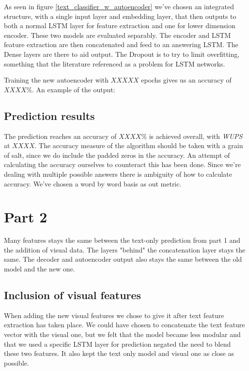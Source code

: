 \documentclass[10pt,a4paper]{report}
\begin{document}
	As seen in figure \ref{text_classifier_w_autoencoder} we've chosen an integrated structure, with a single input layer and embedding layer, that then outputs to both a normal LSTM layer for feature extraction and one for lower dimension encoder. These two models are evaluated separably. The encoder and LSTM feature extraction are then concatenated and feed to an answering LSTM. The Dense layers are there to aid output. The Dropout is to try to limit overfitting, something that the literature referenced as a problem for LSTM networks.
	
	Training the new autoencoder with $ XXXXX $ epochs gives us an accuracy of $ XXXX \%$.  An example of the output:


	\subsection*{Prediction results}
	The prediction reaches an accuracy of $ XXXX\% $ is achieved overall, with \textit{WUPS} at $ XXXX $. The accuracy measure of the algorithm should be taken with a grain of salt, since we do include the padded zeros in the accuracy. An attempt of calculating the accuracy ourselves to counteract this has been done. Since we're dealing with multiple possible answers there is ambiguity of how to calculate accuracy. We've chosen a word by word basis as out metric.
\pagebreak
	\section*{Part 2}
	Many features stays the same between the text-only prediction from part 1 and the addition of visual data. The layers "behind" the concatenation layer stays the same. The decoder and autoencoder output also stays the same between the old model and the new one.
	\subsection*{Inclusion of visual features}
	When adding the new visual features we chose to give it after text feature extraction has taken place. We could have chosen to concatenate the text feature vector with the visual one, but we felt that the model became less modular and that we used a specific LSTM layer for prediction negated the need to blend these two features. It also kept the text only model and visual one as close as possible. 
\end{document}
